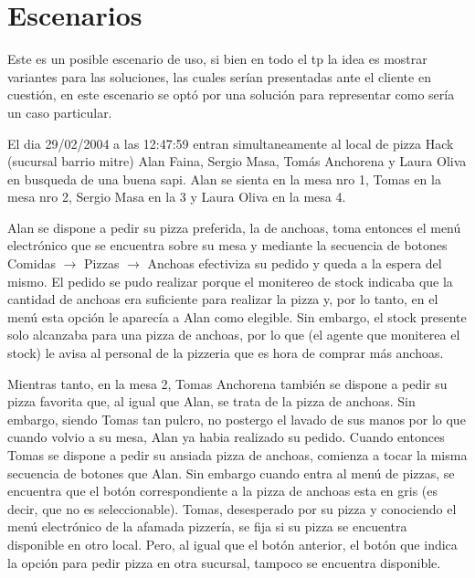 \documentclass[a4paper,10pt]{article}
\begin{document}
\bigskip








\newpage
\section*{Escenarios}

Este es un posible escenario de uso, si bien en todo el tp la idea es mostrar variantes para las soluciones, las cuales ser\'ian presentadas 
ante el cliente en cuesti\'on, en este escenario se opt\'o por una soluci\'on para representar como ser\'ia un caso particular.



El dia 29/02/2004 a las 12:47:59 entran simultaneamente al local de pizza Hack (sucursal barrio mitre) Alan Faina, 
Sergio Masa, Tom\'as Anchorena y Laura Oliva en busqueda de una buena sapi. 
Alan se sienta en la mesa nro 1, Tomas en la mesa nro 2, Sergio Masa en la 3 y Laura Oliva en la mesa 4. 

Alan se dispone a pedir su pizza preferida, la de anchoas, toma entonces el men\'u electr\'onico que se encuentra sobre su mesa y
mediante la secuencia de botones Comidas $\rightarrow$ Pizzas $\rightarrow$ Anchoas efectiviza su pedido y queda a la espera del mismo. El pedido se pudo 
realizar porque el monitereo de stock indicaba que la cantidad de anchoas era suficiente para realizar la pizza y, por lo tanto, en el men\'u
esta opci\'on le aparec\'ia a Alan como elegible. Sin embargo, el stock presente solo alcanzaba para una pizza de anchoas, por lo que (el agente
que moniterea el stock) le avisa al personal de la pizzeria que es hora de comprar m\'as anchoas.

Mientras tanto, en la mesa 2, Tomas Anchorena tambi\'en se dispone a pedir su pizza favorita que, al igual que Alan, se trata de la pizza de 
anchoas. Sin embargo, siendo Tomas tan pulcro, no postergo el lavado de sus manos por lo que cuando volvio a su mesa, Alan ya habia realizado
su pedido. Cuando entonces Tomas se dispone a pedir su ansiada pizza de anchoas, comienza a tocar la misma secuencia de botones que Alan. Sin embargo
cuando entra al men\'u de pizzas, se encuentra que el bot\'on correspondiente a la pizza de anchoas esta en gris (es decir, que no es seleccionable).
Tomas, desesperado por su pizza y conociendo el men\'u electr\'onico de la afamada pizzer\'ia, se fija si su pizza se encuentra disponible en otro
local. Pero, al igual que el bot\'on anterior, el bot\'on que indica la opci\'on para pedir pizza en otra sucursal, tampoco se encuentra disponible.
\end{document}
